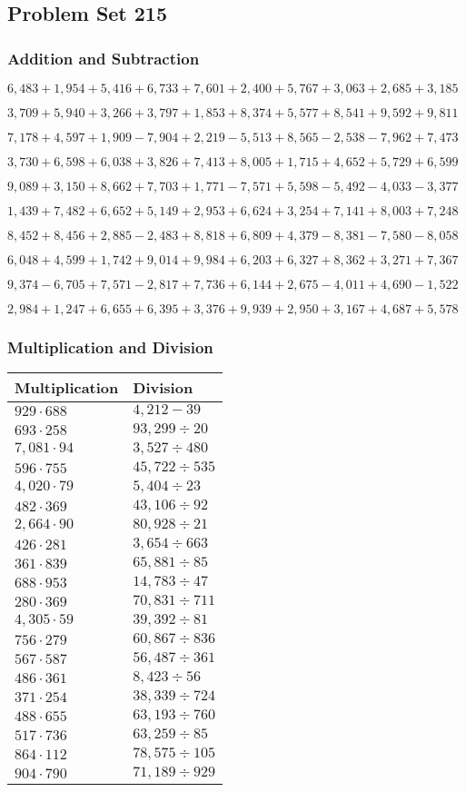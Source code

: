 \hypertarget{problem-set-215}{%
\subsection{Problem Set 215}\label{problem-set-215}}

\hypertarget{addition-and-subtraction}{%
\subsubsection{Addition and
Subtraction}\label{addition-and-subtraction}}

\(6,483+1,954+5,416+6,733+7,601+2,400+5,767+3,063+2,685+3,185\)

\(3,709+5,940+3,266+3,797+1,853+8,374+5,577+8,541+9,592+9,811\)

\(7,178+4,597+1,909-7,904+2,219-5,513+8,565-2,538-7,962+7,473\)

\(3,730+6,598+6,038+3,826+7,413+8,005+1,715+4,652+5,729+6,599\)

\(9,089+3,150+8,662+7,703+1,771-7,571+5,598-5,492-4,033-3,377\)

\(1,439+7,482+6,652+5,149+2,953+6,624+3,254+7,141+8,003+7,248\)

\(8,452+8,456+2,885-2,483+8,818+6,809+4,379-8,381-7,580-8,058\)

\(6,048+4,599+1,742+9,014+9,984+6,203+6,327+8,362+3,271+7,367\)

\(9,374-6,705+7,571-2,817+7,736+6,144+2,675-4,011+4,690-1,522\)

\(2,984+1,247+6,655+6,395+3,376+9,939+2,950+3,167+4,687+5,578\)

\hypertarget{multiplication-and-division}{%
\subsubsection{Multiplication and
Division}\label{multiplication-and-division}}

\begin{longtable}[]{@{}ll@{}}
\toprule
Multiplication & Division\tabularnewline
\midrule
\endhead
\(929\cdot688\) & \(4,212 - 39\)\tabularnewline
\(693\cdot258\) & \(93,299÷20\)\tabularnewline
\(7,081\cdot94\) & \(3,527÷480\)\tabularnewline
\(596\cdot755\) & \(45,722÷535\)\tabularnewline
\(4,020\cdot79\) & \(5,404÷23\)\tabularnewline
\(482\cdot369\) & \(43,106÷92\)\tabularnewline
\(2,664\cdot90\) & \(80,928÷21\)\tabularnewline
\(426\cdot281\) & \(3,654÷663\)\tabularnewline
\(361\cdot839\) & \(65,881÷85\)\tabularnewline
\(688\cdot953\) & \(14,783÷47\)\tabularnewline
\(280\cdot369\) & \(70,831÷711\)\tabularnewline
\(4,305\cdot59\) & \(39,392÷81\)\tabularnewline
\(756\cdot279\) & \(60,867÷836\)\tabularnewline
\(567\cdot587\) & \(56,487÷361\)\tabularnewline
\(486\cdot361\) & \(8,423÷56\)\tabularnewline
\(371\cdot254\) & \(38,339÷724\)\tabularnewline
\(488\cdot655\) & \(63,193÷760\)\tabularnewline
\(517\cdot736\) & \(63,259÷85\)\tabularnewline
\(864\cdot112\) & \(78,575÷105\)\tabularnewline
\(904\cdot790\) & \(71,189÷929\)\tabularnewline
\bottomrule
\end{longtable}
